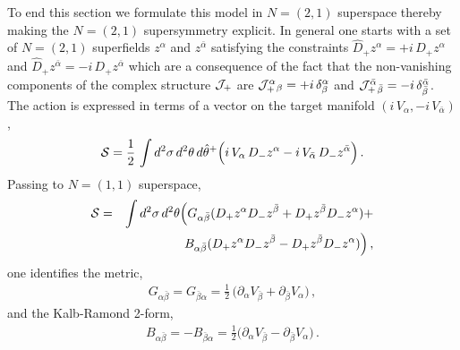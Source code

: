 \documentclass[12pt]{article}
\begin{document}
To end this section we formulate this model in $N=(2,1)$ superspace thereby making the $N=(2,1)$ supersymmetry explicit. In general one starts with a set of $N=(2,1)$ superfields $z^\alpha $ and $z^{\bar \alpha }$ satisfying the constraints $\hat D_+ z^ \alpha =+i\,D_+ z^ \alpha $ and $ \hat D_+ z^ {\bar\alpha} =-i\,D_+ z^ {\bar\alpha} $ which are a consequence of the fact that the non-vanishing components of the complex structure ${\cal J}_+$ are ${\cal J}_+^\alpha {}_\beta =+i \,\delta ^\alpha _ \beta $ and ${\cal J}_+^{\bar \alpha} {}_{\bar\beta} =-i \,\delta ^{\bar \alpha }_ {\bar\beta} $. The action is expressed in terms of a vector on the target manifold $(i\,V_\alpha,-i\, V_{\bar \alpha })$,
\begin{eqnarray}
{\cal S}=\frac 1 2 \,\int d^2 \sigma\, d^2 \theta\, d \hat\theta  {}^+ \Big(
i\,V_\alpha \,D_-z^\alpha -i\,V_{\bar \alpha }\,D_-z^{\bar \alpha }
\Big)\,.\label{n21action}
\end{eqnarray}  
Passing to $N=(1,1)$ superspace,
\begin{eqnarray}
{\cal S}&=&\int d^2 \sigma\, d^2 \theta\Big(
G_{\alpha \bar \beta }(D_+z^ \alpha D_-z^{\bar \beta }+D_+z^ {\bar \beta } D_-z^{\alpha })+ \nonumber\\
&&\qquad
B_{\alpha \bar \beta }(D_+z^ \alpha D_-z^{\bar \beta }-D_+z^ {\bar \beta } D_-z^{\alpha })
\Big)\,,
\end{eqnarray} 
one identifies the metric,
\begin{eqnarray}
G_{ \alpha \bar \beta }=G_{  \bar \beta \alpha }=\frac 1 2\,\Big(\partial _ \alpha V_{\bar \beta }+ \partial _ {\bar \beta } V_{ \alpha  }\Big)\,,
\label{ggg2}
\end{eqnarray} 
and the Kalb-Ramond 2-form,
\begin{eqnarray}
B_{ \alpha \bar \beta }=-B_{  \bar \beta \alpha }=\frac 1 2 \Big(\partial _ \alpha V_{\bar \beta }- \partial _ {\bar \beta } V_{ \alpha  }\Big)\,. 
\label{bbb2}
\end{eqnarray} 
\end{document}
